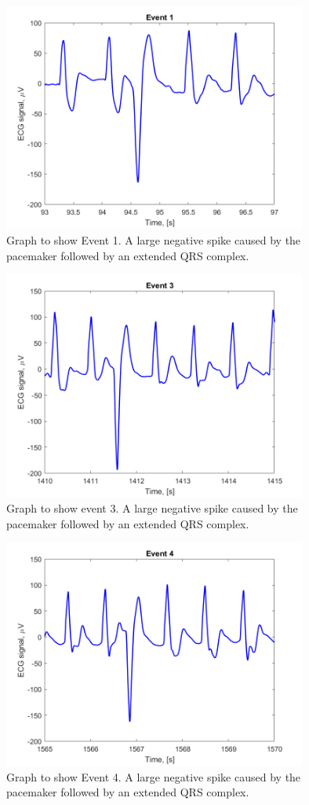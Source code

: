 \documentclass[conference]{IEEEtran}
\begin{document}
\begin{figure}[ht]
\centering
\includegraphics[width=10cm]{images/E1.png}
\caption{Graph to show Event 1. A large negative spike caused by the pacemaker followed by an extended QRS complex.}
\label{fig:E1}
\end{figure}

\begin{figure}[ht]
\centering
\includegraphics[width=10cm]{images/E3.png}
\caption{Graph to show event 3. A large negative spike caused by the pacemaker followed by an extended QRS complex.}
\label{fig:E3}
\end{figure}

\begin{figure}[ht]
\centering
\includegraphics[width=10cm]{images/E4.png}
\caption{Graph to show Event 4. A large negative spike caused by the pacemaker followed by an extended QRS complex.}
\label{fig:E4}
\end{figure}
\end{document}
